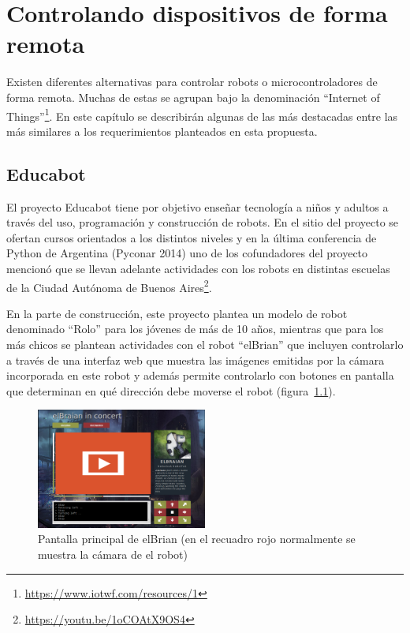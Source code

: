 \chapter{Controlando dispositivos de forma remota}\label{cha:arte}

Existen diferentes alternativas para controlar robots o microcontroladores
de forma remota. Muchas de estas se agrupan bajo la denominación
``Internet of Things''\footnote{\url{https://www.iotwf.com/resources/1}}.
En este capítulo se describirán algunas de las
más destacadas entre las más similares a los requerimientos planteados en
esta propuesta.


\section{Educabot}
El proyecto Educabot tiene por
objetivo enseñar tecnología a niños y adultos a través
del uso, programación y construcción de robots. En el sitio del proyecto
se ofertan cursos orientados a los distintos niveles y 
en la última conferencia de Python de Argentina (Pyconar 2014) uno de
los cofundadores del proyecto mencionó que se llevan adelante actividades
con los robots
en distintas escuelas de la Ciudad Autónoma de Buenos
Aires\footnote{\url{https://youtu.be/1oCOAtX9OS4}}.


En la parte de construcción, este proyecto plantea un modelo de robot
denominado
``Rolo'' para los jóvenes de más de 10 años, mientras que para los más chicos
se plantean actividades con el robot ``elBrian'' que incluyen
controlarlo a través de una interfaz web que muestra las imágenes emitidas
por la cámara incorporada en este robot y además permite controlarlo con
botones en pantalla que determinan en qué dirección debe moverse el robot
(figura~\ref{fig:elbrian}).

\begin{figure}
    \centering
    \includegraphics[width=0.5\textwidth]{figures/elbrian-1}
    \caption{Pantalla principal de elBrian (en el recuadro rojo normalmente
        se muestra la cámara de el robot)}
    \label{fig:elbrian}
\end{figure}

